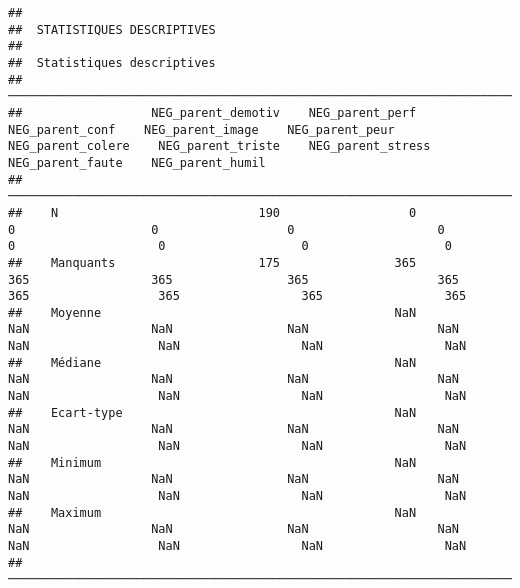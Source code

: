 \documentclass[
]{article}
\begin{document}
\begin{verbatim}
## 
##  STATISTIQUES DESCRIPTIVES
## 
##  Statistiques descriptives                                                                                                                                                                                                
##  ──────────────────────────────────────────────────────────────────────────────────────────────────────────────────────────────────────────────────────────────────────────────────────────────────────────────────────── 
##                  NEG_parent_demotiv    NEG_parent_perf    NEG_parent_conf    NEG_parent_image    NEG_parent_peur    NEG_parent_colere    NEG_parent_triste    NEG_parent_stress    NEG_parent_faute    NEG_parent_humil   
##  ──────────────────────────────────────────────────────────────────────────────────────────────────────────────────────────────────────────────────────────────────────────────────────────────────────────────────────── 
##    N                            190                  0                  0                   0                  0                    0                    0                    0                   0                   0   
##    Manquants                    175                365                365                 365                365                  365                  365                  365                 365                 365   
##    Moyenne                                         NaN                NaN                 NaN                NaN                  NaN                  NaN                  NaN                 NaN                 NaN   
##    Médiane                                         NaN                NaN                 NaN                NaN                  NaN                  NaN                  NaN                 NaN                 NaN   
##    Ecart-type                                      NaN                NaN                 NaN                NaN                  NaN                  NaN                  NaN                 NaN                 NaN   
##    Minimum                                         NaN                NaN                 NaN                NaN                  NaN                  NaN                  NaN                 NaN                 NaN   
##    Maximum                                         NaN                NaN                 NaN                NaN                  NaN                  NaN                  NaN                 NaN                 NaN   
##  ──────────────────────────────────────────────────────────────────────────────────────────────────────────────────────────────────────────────────────────────────────────────────────────────────────────────────────── 

\end{verbatim}
\end{document}
